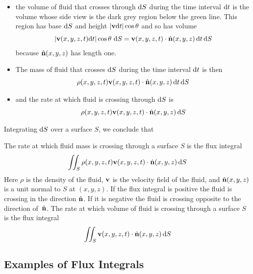 \begin{itemize}\itemsep1pt \parskip0pt  %
\item[$\circ$] 
the volume of fluid that crosses through $\mathrm{d}S$ during the time 
interval $\mathrm{d}t$ is the volume  whose side view is the dark grey 
region below the green line. This region has base $\mathrm{d}S$ and 
height $|\mathbf{v}\mathrm{d}t|\cos\theta$ and so has volume
\begin{equation*}
|\mathbf{v}(x,y,z,t)\mathrm{d}t|\cos\theta\ \mathrm{d}S
   =\mathbf{v}(x,y,z,t)\cdot\hat{\mathbf{n}}(x,y,z)\,\mathrm{d}t\,\mathrm{d}S
\end{equation*}
because $\hat{\mathbf{n}}(x,y,z)$ has length one. 
\item[$\circ$]
 The mass of fluid that crosses $\mathrm{d}S$ during the time interval $\mathrm{d}t$
 is then 
\begin{equation*}
\rho(x,y,z,t)\mathbf{v}(x,y,z,t)\cdot\hat{\mathbf{n}}(x,y,z)\,\mathrm{d}t\,\mathrm{d}S
\end{equation*}
\item[$\circ$]
and the rate at which fluid is crossing through $\mathrm{d}S$ is
\begin{equation*}
\rho(x,y,z,t)\mathbf{v}(x,y,z,t)\cdot\hat{\mathbf{n}}(x,y,z)\,\mathrm{d}S
\end{equation*}
\end{itemize}
Integrating $\mathrm{d}S$ over a surface $S$, we conclude that
\begin{lemma}\label{lem:fluxInterp}
The rate at which fluid mass is crossing through a surface $S$ is the flux integral
\begin{align*}
\iint_S \rho(x,y,z,t)\mathbf{v}(x,y,z,t)\cdot\hat{\mathbf{n}}(x,y,z)\,\mathrm{d}S
\end{align*}
Here $\rho$ is the density of the fluid, $\mathbf{v}$ is
the velocity field of the fluid, and $\hat{\mathbf{n}}(x,y,z)$ is a unit normal 
to $S$ at $(x,y,z)$.
If the flux integral is positive the fluid is crossing in the direction 
$\hat{\mathbf{n}}$. If it is negative the fluid is crossing opposite to the direction 
of~$\hat{\mathbf{n}}$. The rate at which volume of fluid is crossing through a surface $S$ is the flux integral
\begin{align*}
\iint_S \mathbf{v}(x,y,z,t)\cdot\hat{\mathbf{n}}(x,y,z)\,\mathrm{d}S
\end{align*}
\end{lemma}

\subsection{Examples of Flux Integrals}\label{sec:fluxEexamples}

